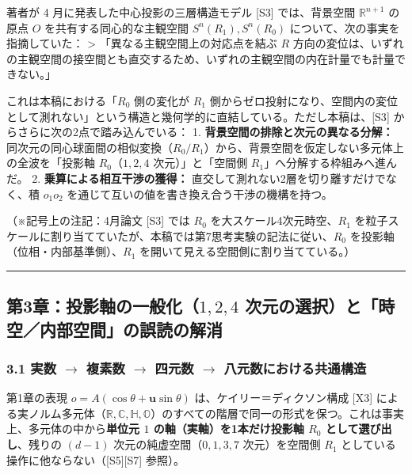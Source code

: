 \documentclass[
  a4paper,
]{ltjsarticle}
\begin{document}
著者が 4 月に発表した中心投影の三層構造モデル {[}S3{]} では、背景空間
\(\mathbb{R}^{n+1}\) の原点 \(O\) を共有する同心的な主観空間
\(S^n(R_1), S^n(R_0)\) について、次の事実を指摘していた： \textgreater{}
「異なる主観空間上の対応点を結ぶ \(R\)
方向の変位は、いずれの主観空間の接空間とも直交するため、いずれの主観空間の内在計量でも計量できない。」

これは本稿における「\(R_0\) 側の変化が \(R_1\)
側からゼロ投射になり、空間内の変位として測れない」という構造と幾何学的に直結している。ただし本稿は、{[}S3{]}
からさらに次の2点で踏み込んでいる： 1.
\textbf{背景空間の排除と次元の異なる分解：}
同次元の同心球面間の相似変換（\(R_0 / R_1\)）から、背景空間を仮定しない多元体上の全波を「投影軸
\(R_0\)（\(1, 2, 4\) 次元）」と「空間側
\(R_1\)」へ分解する枠組みへ進んだ。 2.
\textbf{乗算による相互干渉の獲得：}
直交して測れない2層を切り離すだけでなく、積 \(o_1 o_2\)
を通じて互いの値を書き換え合う干渉の機構を持つ。

（※記号上の注記：4月論文 {[}S3{]} では \(R_0\)
を大スケール4次元時空、\(R_1\)
を粒子スケールに割り当てていたが、本稿では第7思考実験の記法に従い、\(R_0\)
を投影軸（位相・内部基準側）、\(R_1\)
を開いて見える空間側に割り当てている。）

\begin{center}\rule{0.5\linewidth}{0.5pt}\end{center}

\subsection{\texorpdfstring{第3章：投影軸の一般化（\(1, 2, 4\)
次元の選択）と「時空／内部空間」の誤読の解消}{第3章：投影軸の一般化（1, 2, 4 次元の選択）と「時空／内部空間」の誤読の解消}}\label{ux7b2c3ux7ae0ux6295ux5f71ux8ef8ux306eux4e00ux822cux53161-2-4-ux6b21ux5143ux306eux9078ux629eux3068ux6642ux7a7aux5185ux90e8ux7a7aux9593ux306eux8aa4ux8aadux306eux89e3ux6d88}

\subsubsection{\texorpdfstring{3.1 実数 \(\to\) 複素数 \(\to\) 四元数
\(\to\)
八元数における共通構造}{3.1 実数 \textbackslash to 複素数 \textbackslash to 四元数 \textbackslash to 八元数における共通構造}}\label{ux5b9fux6570-to-ux8907ux7d20ux6570-to-ux56dbux5143ux6570-to-ux516bux5143ux6570ux306bux304aux3051ux308bux5171ux901aux69cbux9020}

第1章の表現 \(o = A(\cos\theta + \mathbf{u}\sin\theta)\)
は、ケイリー＝ディクソン構成 {[}X3{]}
による実ノルム多元体（\(\mathbb{R}, \mathbb{C}, \mathbb{H}, \mathbb{O}\)）のすべての階層で同一の形式を保つ。これは事実上、多元体の中から\textbf{単位元
\(1\) の軸（実軸）を1本だけ投影軸 \(R_0\) として選び出し}、残りの
\((d-1)\) 次元の純虚空間（\(0, 1, 3, 7\) 次元）を空間側 \(R_1\)
としている操作に他ならない（{[}S5{]}{[}S7{]} 参照）。
\end{document}
